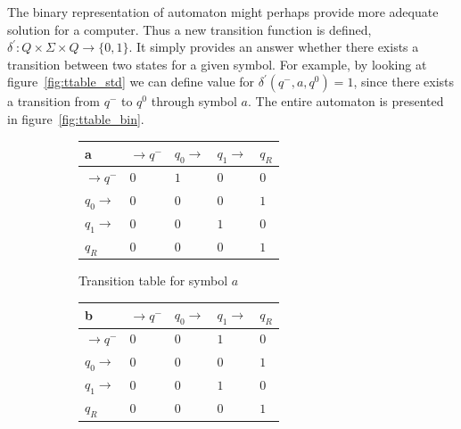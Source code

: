 \documentclass{article}
\begin{document}
The binary representation of automaton might perhaps provide more adequate solution for a computer. Thus a new transition function is defined, $\delta^{'}: Q \times \Sigma \times Q \rightarrow \{0,1\}$. It simply provides an answer whether there exists a transition between two states for a given symbol. For example, by looking at figure~\ref{fig:ttable_std} we can define value for $\delta^{'}(q^-,a,q^0) = 1$, since there exists a transition from $q^-$ to $q^0$ through symbol $a$. The entire automaton is presented in figure~\ref{fig:ttable_bin}.


%
%
\begin{figure}[H]
\begin{center}

	\setlength{\tabcolsep}{4pt}
	\renewcommand{\arraystretch}{1.4}
	
	\begin{subfigure}{.5\textwidth}

	\centering
	\begin{tabular}{|P{1.0cm} || P{0.8cm} | P{0.8cm} | P{0.8cm} | P{0.8cm}|}

	\hline
	a & $\rightarrow q^-$ & $q_0 \rightarrow$ & $q_1 \rightarrow$ & $q_R$ \\
	\hline
	\hline
	$\rightarrow q^-$ 		& $0$ & $1$ & $0$ & $0$ \\
	\hline
	$q_0 \rightarrow$ 		& $0$ & $0$ & $0$ & $1$ \\
	\hline
	$q_1 \rightarrow$ 		& $0$ & $0$ & $1$ & $0$ \\
	\hline
	$q_R$  					& $0$ & $0$ & $0$ & $1$ \\
	\hline

	\end{tabular}

	\caption{Transition table for symbol $a$}
	\label{fig:ttable_bin_a}	
	
	\end{subfigure}%
	\begin{subfigure}{.5\textwidth}
	
	\centering
	\begin{tabular}{|P{1.0cm} || P{0.8cm} | P{0.8cm} | P{0.8cm} | P{0.8cm}|}
	
	\hline
	b & $\rightarrow q^-$ & $q_0 \rightarrow$ & $q_1 \rightarrow$ & $q_R$ \\
	\hline
	\hline
	$\rightarrow q^-$ 		& $0$ & $0$ & $1$ & $0$ \\
	\hline
	$q_0 \rightarrow$ 		& $0$ & $0$ & $0$ & $1$ \\
	\hline
	$q_1 \rightarrow$ 		& $0$ & $0$ & $1$ & $0$ \\
	\hline
	$q_R$  					& $0$ & $0$ & $0$ & $1$ \\
	\hline


\end{tabular}
\end{subfigure}
\end{center}
\end{figure}
\end{document}
